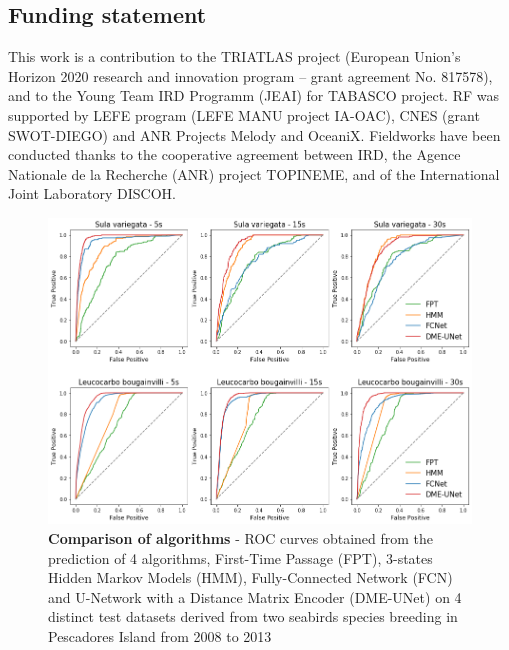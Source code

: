 \documentclass{article}
\begin{document}
\subsection*{Funding statement}
This work is a contribution to the TRIATLAS project (European Union's Horizon 2020 research and innovation program – grant agreement No. 817578), and to the Young Team IRD Programm (JEAI) for TABASCO project. RF was supported by LEFE program (LEFE MANU project IA-OAC), CNES (grant SWOT-DIEGO) and ANR Projects Melody and OceaniX. Fieldworks have been conducted thanks to the cooperative agreement between IRD, the Agence Nationale de la Recherche (ANR) project TOPINEME, and of the International Joint Laboratory DISCOH.

\printbibliography

\newpage

\begin{figure}[h]
  \centering
  \includegraphics[scale=0.5]{figure1.png}
  \caption{\textbf{Comparison of algorithms} - ROC curves obtained from the prediction of 4 algorithms, First-Time Passage (FPT), 3-states Hidden Markov Models (HMM), Fully-Connected Network (FCN) and U-Network with a Distance Matrix Encoder (DME-UNet) on 4 distinct test datasets derived from two seabirds species breeding in Pescadores Island from 2008 to 2013}
  \label{figure1}
\end{figure}
\end{document}
